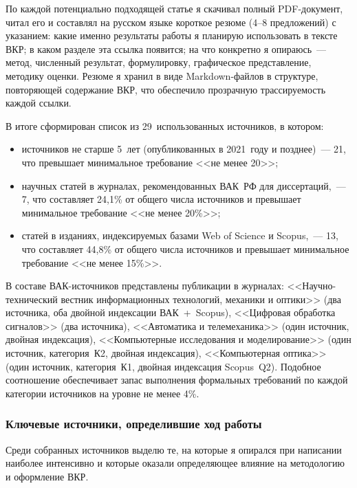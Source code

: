 По каждой потенциально подходящей статье я скачивал полный
PDF-документ, читал его и составлял на русском языке короткое
резюме (4--8 предложений) с указанием: какие именно результаты
работы я планирую использовать в тексте ВКР; в каком разделе
эта ссылка появится; на что конкретно я опираюсь~--- метод,
численный результат, формулировку, графическое представление,
методику оценки. Резюме я хранил в виде Markdown-файлов в
структуре, повторяющей содержание ВКР, что обеспечило
прозрачную трассируемость каждой ссылки.

В итоге сформирован список из 29~использованных источников, в
котором:
\begin{itemize}
	\item источников не старше 5~лет (опубликованных в 2021~году
	      и позднее)~--- 21, что превышает минимальное требование
	      <<не менее 20>>;
	\item научных статей в журналах, рекомендованных ВАК~РФ для
	      диссертаций,~--- 7, что составляет 24,1\% от общего
	      числа источников и превышает минимальное требование
	      <<не менее 20\%>>;
	\item статей в изданиях, индексируемых базами Web of
	      Science и Scopus,~--- 13, что составляет 44,8\% от общего
	      числа источников и превышает минимальное требование
	      <<не менее 15\%>>.
\end{itemize}

В составе ВАК-источников представлены публикации в журналах:
<<Научно-технический вестник информационных технологий, механики
и оптики>> (два источника, оба двойной индексации
ВАК~+~Scopus), <<Цифровая обработка сигналов>> (два источника),
<<Автоматика и телемеханика>> (один источник, двойная
индексация), <<Компьютерные исследования и моделирование>>
(один источник, категория~К2, двойная индексация),
<<Компьютерная оптика>> (один источник, категория~К1, двойная
индексация Scopus~Q2). Подобное соотношение обеспечивает
запас выполнения формальных требований по каждой категории
источников на уровне не менее 4\%.

\subsubsection{Ключевые источники, определившие ход работы}

Среди собранных источников выделю те, на которые я опирался при
написании наиболее интенсивно и которые оказали определяющее
влияние на методологию и оформление ВКР.

